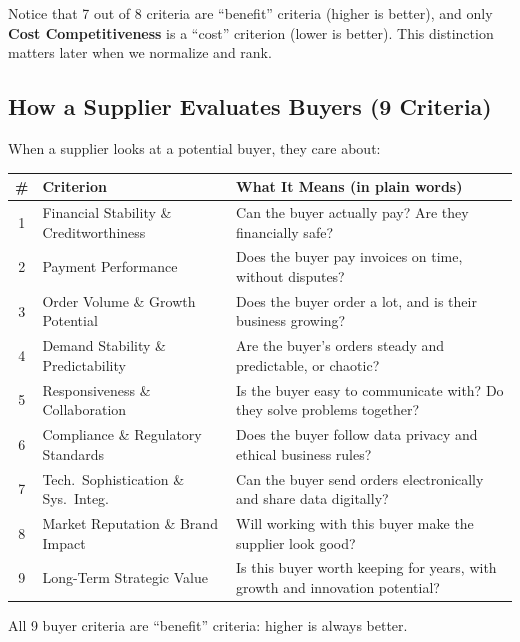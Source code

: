 \documentclass[11pt]{article}
\begin{document}
Notice that 7 out of 8 criteria are ``benefit'' criteria (higher is better), and only \textbf{Cost Competitiveness} is a ``cost'' criterion (lower is better). This distinction matters later when we normalize and rank.

\subsection{How a Supplier Evaluates Buyers (9 Criteria)}

When a supplier looks at a potential buyer, they care about:

\begin{center}
\small
\begin{tabular}{clp{8cm}}
\toprule
\textbf{\#} & \textbf{Criterion} & \textbf{What It Means (in plain words)} \\
\midrule
1 & Financial Stability \& Creditworthiness & Can the buyer actually pay? Are they financially safe? \\
2 & Payment Performance & Does the buyer pay invoices on time, without disputes? \\
3 & Order Volume \& Growth Potential & Does the buyer order a lot, and is their business growing? \\
4 & Demand Stability \& Predictability & Are the buyer's orders steady and predictable, or chaotic? \\
5 & Responsiveness \& Collaboration & Is the buyer easy to communicate with? Do they solve problems together? \\
6 & Compliance \& Regulatory Standards & Does the buyer follow data privacy and ethical business rules? \\
7 & Tech.\ Sophistication \& Sys.\ Integ. & Can the buyer send orders electronically and share data digitally? \\
8 & Market Reputation \& Brand Impact & Will working with this buyer make the supplier look good? \\
9 & Long-Term Strategic Value & Is this buyer worth keeping for years, with growth and innovation potential? \\
\bottomrule
\end{tabular}
\end{center}

All 9 buyer criteria are ``benefit'' criteria: higher is always better.

\end{document}
